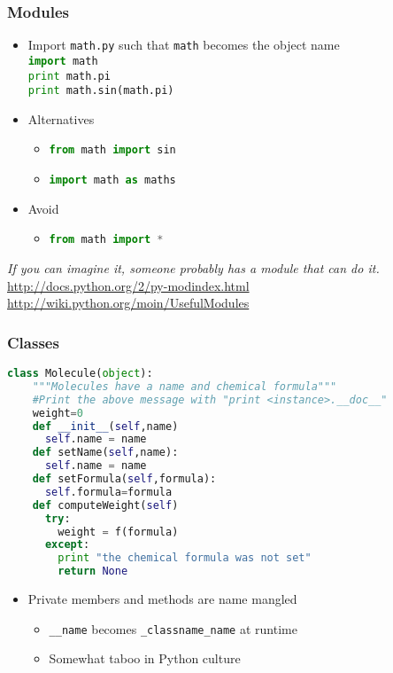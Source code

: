 \documentclass[xcolor=table,10pt,final]{beamer}
\begin{document}
\begin{frame}
  \frametitle{Modules}
  \begin{itemize}
    \item Import {\tt math.py} such that {\tt math} becomes the object name\\
      \lstinline[language=python]|import math|\\
      \lstinline[language=python]|print math.pi|\\
      \lstinline[language=python]|print math.sin(math.pi)|
    \item Alternatives
      \begin{itemize}
        \item \lstinline[language=python]|from math import sin|
        \item \lstinline[language=python]|import math as maths|
      \end{itemize}
    \item Avoid
      \begin{itemize}
        \item \lstinline[language=python]|from math import *|
      \end{itemize}
  \end{itemize}
  \vskip1cm
{\it If you can imagine it, someone probably has a module that can do it.}\\
{\scriptsize \url{http://docs.python.org/2/py-modindex.html}}\\
{\scriptsize \url{http://wiki.python.org/moin/UsefulModules}}\\
\end{frame}

\begin{frame}[fragile]
  \frametitle{Classes}
  \begin{lstlisting}[language=python]
  class Molecule(object):
    """Molecules have a name and chemical formula"""
    #Print the above message with "print <instance>.__doc__"
    weight=0
    def __init__(self,name)
      self.name = name
    def setName(self,name):
      self.name = name
    def setFormula(self,formula):
      self.formula=formula
    def computeWeight(self)
      try:
        weight = f(formula)
      except:
        print "the chemical formula was not set"
        return None
   \end{lstlisting}
   \begin{itemize}
     \item Private members and methods are name mangled
       \begin{itemize}
         \item \lstinline[language=python]|__name| becomes \lstinline[language=python]|_classname_name| at runtime
         \item Somewhat taboo in Python culture
       \end{itemize}
   \end{itemize}
\end{frame}
\end{document}

